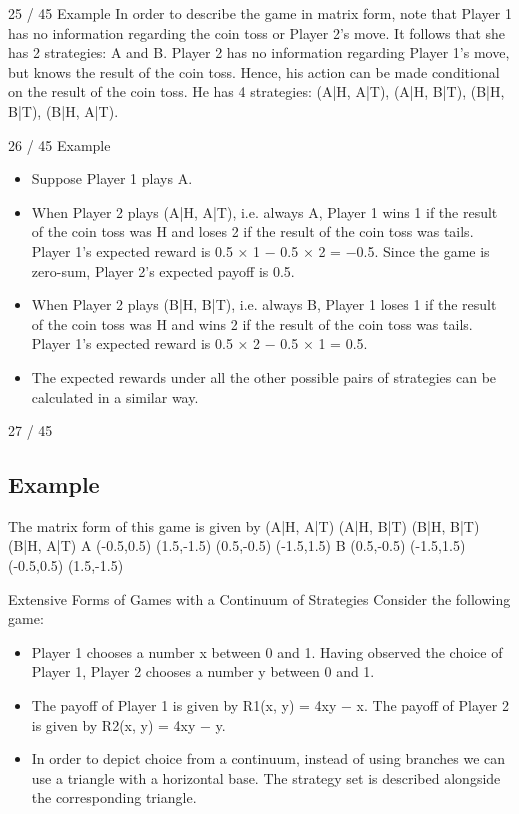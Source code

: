 \documentclass[]{report}
\begin{document}
25 / 45
Example
In order to describe the game in matrix form, note that Player 1
has no information regarding the coin toss or Player 2’s move. It
follows that she has 2 strategies: A and B.
Player 2 has no information regarding Player 1’s move, but knows
the result of the coin toss. Hence, his action can be made
conditional on the result of the coin toss. He has 4 strategies:
(A|H, A|T), (A|H, B|T), (B|H, B|T), (B|H, A|T).

26 / 45
Example
\begin{itemize}
	\item Suppose Player 1 plays A.
	\item	When Player 2 plays (A|H, A|T), i.e. always A, Player 1 wins 1 if
	the result of the coin toss was H and loses 2 if the result of the
	coin toss was tails. Player 1’s expected reward is
	0.5 × 1 − 0.5 × 2 = −0.5. Since the game is zero-sum, Player 2’s
	expected payoff is 0.5.
	\item	When Player 2 plays (B|H, B|T), i.e. always B, Player 1 loses 1 if
	the result of the coin toss was H and wins 2 if the result of the
	coin toss was tails. Player 1’s expected reward is
	0.5 × 2 − 0.5 × 1 = 0.5.
	\item	The expected rewards under all the other possible pairs of
	strategies can be calculated in a similar way.
\end{itemize}


27 / 45
\subsection{Example}
The matrix form of this game is given by
(A|H, A|T) (A|H, B|T) (B|H, B|T) (B|H, A|T)
A (-0.5,0.5) (1.5,-1.5) (0.5,-0.5) (-1.5,1.5)
B (0.5,-0.5) (-1.5,1.5) (-0.5,0.5) (1.5,-1.5)

Extensive Forms of Games with a Continuum of Strategies
Consider the following game:
\begin{itemize}
	\item Player 1 chooses a number x between 0 and 1. Having observed
	the choice of Player 1, Player 2 chooses a number y between 0 and
	1.
	\item The payoff of Player 1 is given by R1(x, y) = 4xy − x. The payoff
	of Player 2 is given by R2(x, y) = 4xy − y.
	\item In order to depict choice from a continuum, instead of using
	branches we can use a triangle with a horizontal base. The
	strategy set is described alongside the corresponding triangle.
\end{itemize}
\end{document}
